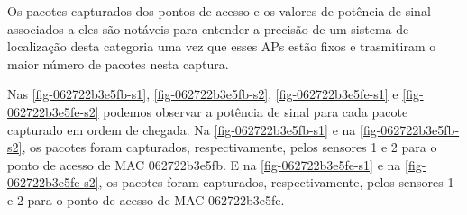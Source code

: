 Os pacotes capturados dos pontos de acesso e os valores de potência de sinal
associados a eles são notáveis para entender a precisão de um sistema de localização
desta categoria uma vez que esses APs estão fixos e trasmitiram o
maior número de pacotes nesta captura.

Nas \autoref{fig-062722b3e5fb-s1}, \autoref{fig-062722b3e5fb-s2},
\autoref{fig-062722b3e5fe-s1} e \autoref{fig-062722b3e5fe-s2} podemos observar
a potência de sinal para cada pacote capturado em ordem de chegada. Na \autoref{fig-062722b3e5fb-s1} e
na \autoref{fig-062722b3e5fb-s2}, os pacotes
foram capturados, respectivamente, pelos sensores 1 e 2 para o ponto de acesso de MAC 062722b3e5fb. E na
\autoref{fig-062722b3e5fe-s1} e na \autoref{fig-062722b3e5fe-s2}, os pacotes foram capturados, respectivamente, pelos sensores 1 e 2 para
o ponto de acesso de MAC 062722b3e5fe.


